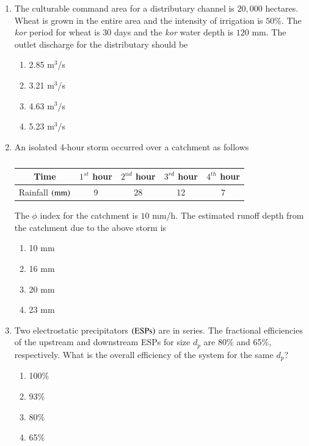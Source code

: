 \documentclass[journal,12pt,onecolumn]{IEEEtran}
\theoremstyle{remark}
\begin{document}
\begin{enumerate}
\item The culturable command area for a distributary channel is $20,000$ hectares. Wheat is grown in the entire area and the intensity of irrigation is $50\%$. The \textit{kor} period for wheat is $30$ days and the \textit{kor} water depth is $120$ mm. The outlet discharge for the distributary should be

\hfill{}
\begin{enumerate}
\item 2.85 m$^3$/s
\item 3.21 m$^3$/s
\item 4.63 m$^3$/s
\item 5.23 m$^3$/s
\end{enumerate}

\item An isolated 4-hour storm occurred over a catchment as follows

\begin{table}[H]
\centering
\begin{tabular}{|c|c|c|c|c|}
\hline
Time & $1^{st}$ hour & $2^{nd}$ hour & $3^{rd}$ hour & $4^{th}$ hour \\
\hline
Rainfall $\left(\text{mm}\right)$ & 9 & 28 & 12 & 7 \\
\hline
\end{tabular}
\caption*{}
\label{tab:Q.56}
\end{table}
The $\phi$ index for the catchment is $10$ mm/h. The estimated runoff depth from the catchment due to the above storm is

\hfill{}
\begin{enumerate}
\item 10 mm
\item 16 mm
\item 20 mm
\item 23 mm
\end{enumerate}

\item Two electrostatic precipitators $\left(\text{ESPs}\right)$ are in series. The fractional efficiencies of the upstream and downstream ESPs for size $d_p$ are 80\% and 65\%, respectively. What is the overall efficiency of the system for the same $d_p$?

\hfill{}
\begin{enumerate}
\item 100\%
\item 93\%
\item 80\%
\item 65\%
\end{enumerate}


\end{enumerate}
\end{document}
